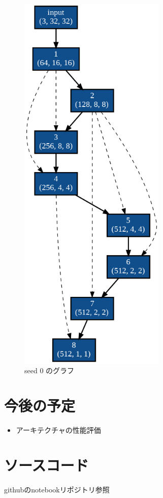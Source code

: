 \documentclass[twocolumn]{jarticle}     %
\begin{document}
\begin{figure}[tb]
	\begin{center}
		\includegraphics[clip,width=70mm]{graph0.png}
		\caption{seed 0 のグラフ}
		\label{fig:graph0}
	\end{center}
\end{figure}

\section{今後の予定}

\begin{itemize}
  \item アーキテクチャの性能評価
\end{itemize}

\section{ソースコード}
githubのnotebookリポジトリ参照



\end{document}
